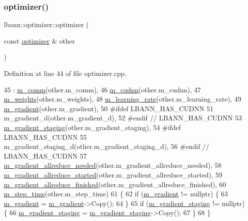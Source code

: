 \subsubsection{\texorpdfstring{optimizer()}{optimizer()}\hspace{0.1cm}{\footnotesize\ttfamily [2/2]}}
{\footnotesize\ttfamily lbann\+::optimizer\+::optimizer (\begin{DoxyParamCaption}\item[{const \hyperlink{classlbann_1_1optimizer}{optimizer} \&}]{other }\end{DoxyParamCaption})}



Definition at line 44 of file optimizer.\+cpp.


\begin{DoxyCode}
45   : \hyperlink{classlbann_1_1optimizer_a8c2569a8fcf0ee969517067b81896c44}{m\_comm}(other.m\_comm),
46     \hyperlink{classlbann_1_1optimizer_a2f24dbeaca18b06f4aa7d179bbf96680}{m\_cudnn}(other.m\_cudnn),
47     \hyperlink{classlbann_1_1optimizer_a33b57b578a089d9ffe6715bb3996907c}{m\_weights}(other.m\_weights),
48     \hyperlink{classlbann_1_1optimizer_ad393dcdcb82b44510c586ed5ec46d4dd}{m\_learning\_rate}(other.m\_learning\_rate),
49     \hyperlink{classlbann_1_1optimizer_a3df20cb0ae2b60430ad4fd235d66c12e}{m\_gradient}(other.m\_gradient),
50 \textcolor{preprocessor}{    #ifdef LBANN\_HAS\_CUDNN}
51     m\_gradient\_d(other.m\_gradient\_d),
52 \textcolor{preprocessor}{    #endif // LBANN\_HAS\_CUDNN}
53     \hyperlink{classlbann_1_1optimizer_a92cd058d4f9fc8162d36d52461a96df2}{m\_gradient\_staging}(other.m\_gradient\_staging),
54 \textcolor{preprocessor}{    #ifdef LBANN\_HAS\_CUDNN}
55     m\_gradient\_staging\_d(other.m\_gradient\_staging\_d),
56 \textcolor{preprocessor}{    #endif // LBANN\_HAS\_CUDNN}
57     \hyperlink{classlbann_1_1optimizer_a2dc18dcc3cf9510947304c3c5d059eb0}{m\_gradient\_allreduce\_needed}(other.m\_gradient\_allreduce\_needed),
58     \hyperlink{classlbann_1_1optimizer_ac77740a916f397600efae0c03bc5a045}{m\_gradient\_allreduce\_started}(other.m\_gradient\_allreduce\_started),
59     \hyperlink{classlbann_1_1optimizer_a4d332551d05e245ad3f862653b5af65a}{m\_gradient\_allreduce\_finished}(other.m\_gradient\_allreduce\_finished),
60     \hyperlink{classlbann_1_1optimizer_afc424c715008fb4d900548f7934ea856}{m\_step\_time}(other.m\_step\_time)
61 \{
62   \textcolor{keywordflow}{if} (\hyperlink{classlbann_1_1optimizer_a3df20cb0ae2b60430ad4fd235d66c12e}{m\_gradient} != \textcolor{keyword}{nullptr}) \{
63     \hyperlink{classlbann_1_1optimizer_a3df20cb0ae2b60430ad4fd235d66c12e}{m\_gradient} = \hyperlink{classlbann_1_1optimizer_a3df20cb0ae2b60430ad4fd235d66c12e}{m\_gradient}->Copy();
64   \}
65   \textcolor{keywordflow}{if} (\hyperlink{classlbann_1_1optimizer_a92cd058d4f9fc8162d36d52461a96df2}{m\_gradient\_staging} != \textcolor{keyword}{nullptr}) \{
66     \hyperlink{classlbann_1_1optimizer_a92cd058d4f9fc8162d36d52461a96df2}{m\_gradient\_staging} = \hyperlink{classlbann_1_1optimizer_a92cd058d4f9fc8162d36d52461a96df2}{m\_gradient\_staging}->Copy();
67   \}
68 \}
\end{DoxyCode}
